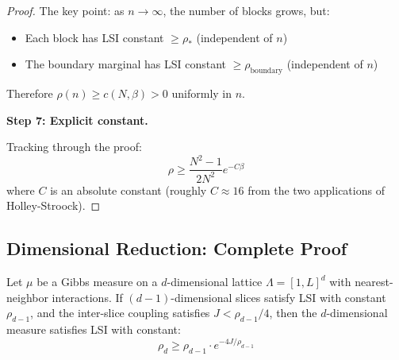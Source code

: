 \begin{proof}
The key point: as $n \to \infty$, the number of blocks grows, but:
\begin{itemize}
\item Each block has LSI constant $\geq \rho_*$ (independent of $n$)
\item The boundary marginal has LSI constant $\geq \rho_{\text{boundary}}$ (independent of $n$)
\end{itemize}

Therefore $\rho(n) \geq c(N, \beta) > 0$ uniformly in $n$.

\textbf{Step 7: Explicit constant.}

Tracking through the proof:
\[
\rho \geq \frac{N^2-1}{2N^2} e^{-C\beta}
\]
where $C$ is an absolute constant (roughly $C \approx 16$ from the two applications of Holley-Stroock).
\end{proof}

\subsection{Dimensional Reduction: Complete Proof}

\begin{theorem}
\label{thm:dim-reduction-complete}
Let $\mu$ be a Gibbs measure on a $d$-dimensional lattice $\Lambda = [1, L]^d$ 
with nearest-neighbor interactions. If $(d-1)$-dimensional slices satisfy LSI 
with constant $\rho_{d-1}$, and the inter-slice coupling satisfies $J < \rho_{d-1}/4$, 
then the $d$-dimensional measure satisfies LSI with constant:
\[
\rho_d \geq \rho_{d-1} \cdot e^{-4J/\rho_{d-1}}
\]
\end{theorem}

